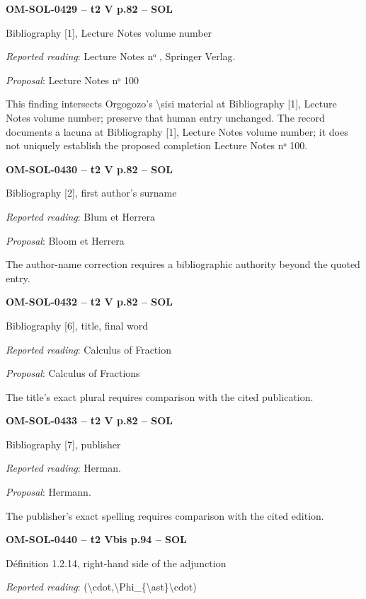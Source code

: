 \par\noindent\textbf{OM-SOL-0429 -- t2 V p.82 -- SOL}\par
Bibliography [1], Lecture Notes volume number\par
\emph{Reported reading}: Lecture Notes nᵒ , Springer Verlag.\par
\emph{Proposal}: Lecture Notes nᵒ 100\par
This finding intersects Orgogozo's \textbackslash{}sisi material at Bibliography [1], Lecture Notes volume number; preserve that human entry unchanged. The record documents a lacuna at Bibliography [1], Lecture Notes volume number; it does not uniquely establish the proposed completion Lecture Notes nᵒ 100.\par
\par\noindent\textbf{OM-SOL-0430 -- t2 V p.82 -- SOL}\par
Bibliography [2], first author's surname\par
\emph{Reported reading}: Blum et Herrera\par
\emph{Proposal}: Bloom et Herrera\par
The author-name correction requires a bibliographic authority beyond the quoted entry.\par
\par\noindent\textbf{OM-SOL-0432 -- t2 V p.82 -- SOL}\par
Bibliography [6], title, final word\par
\emph{Reported reading}: Calculus of Fraction\par
\emph{Proposal}: Calculus of Fractions\par
The title's exact plural requires comparison with the cited publication.\par
\par\noindent\textbf{OM-SOL-0433 -- t2 V p.82 -- SOL}\par
Bibliography [7], publisher\par
\emph{Reported reading}: Herman.\par
\emph{Proposal}: Hermann.\par
The publisher's exact spelling requires comparison with the cited edition.\par
\par\noindent\textbf{OM-SOL-0440 -- t2 Vbis p.94 -- SOL}\par
Définition 1.2.14, right-hand side of the adjunction\par
\emph{Reported reading}: (\textbackslash{}cdot,\textbackslash{}Phi\_\{\textbackslash{}ast\}\textbackslash{}cdot)\par
